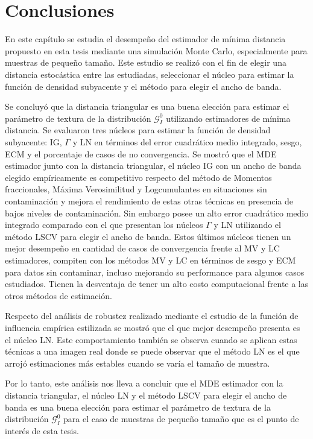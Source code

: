 \section{Conclusiones}

En este capítulo se estudia el desempeño del estimador de mínima distancia propuesto en esta tesis mediante una simulación Monte Carlo, especialmente para muestras de pequeño tamaño. Este estudio se realizó con el fin de elegir una distancia estocástica entre las estudiadas, seleccionar el núcleo para estimar la función de densidad subyacente y el método para elegir el ancho de banda.

Se concluyó que la distancia triangular es una buena elección para estimar el parámetro de textura de la distribución $\mathcal{G}_I^0$ utilizando estimadores de mínima distancia. Se evaluaron tres núcleos para estimar la función de densidad subyacente: IG, $\Gamma$ y LN en términos del error cuadrático medio integrado, sesgo, ECM y el porcentaje de casos de no convergencia. Se mostró que el MDE estimador junto con la distancia triangular, el núcleo IG con un ancho de banda elegido empíricamente es competitivo respecto del método de Momentos fraccionales, Máxima Verosimilitud y Logcumulantes en situaciones sin contaminación y mejora el rendimiento de estas otras técnicas en presencia de bajos niveles de contaminación. Sin embargo posee un alto error cuadrático medio integrado comparado con el que presentan los núcleos $\Gamma$ y LN utilizando el método LSCV para elegir el ancho de banda. Estos últimos núcleos tienen un mejor desempeño en cantidad de casos de convergencia frente al MV y LC estimadores, compiten con los métodos MV y LC en términos de sesgo y ECM para datos sin contaminar, incluso mejorando su performance para algunos casos estudiados. Tienen la desventaja de tener un alto costo computacional frente a las otros métodos de estimación.

Respecto del análisis de robustez realizado mediante el estudio de la función de influencia empírica estilizada se mostró que el que mejor desempeño presenta es el núcleo LN. Este comportamiento también se observa cuando se aplican estas técnicas a una imagen real donde se puede observar que el método LN es el que arrojó estimaciones más estables cuando se varía el tamaño de muestra.

 Por lo tanto, este análisis nos lleva a concluir que el MDE estimador con la distancia triangular, el núcleo LN y el método LSCV para elegir el ancho de banda es una buena elección para estimar el parámetro de textura de la distribución $\mathcal{G}_I^0$ para el caso de muestras de pequeño tamaño que es el punto de interés de esta tesis.
